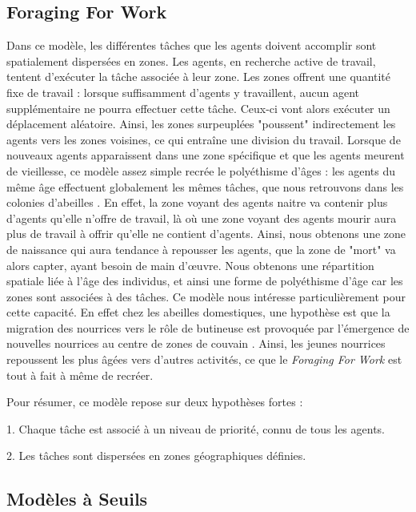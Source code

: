 		\subsection{Foraging For Work  \cite{franks_foraging_1994}}
        Dans ce modèle, les différentes tâches que les agents doivent accomplir sont spatialement dispersées en zones. Les agents, en recherche active de travail, tentent d'exécuter la tâche associée à leur zone. Les zones offrent une quantité fixe de travail : lorsque suffisamment d'agents y travaillent, aucun agent supplémentaire ne pourra effectuer cette tâche. Ceux-ci vont alors exécuter un déplacement aléatoire. Ainsi, les zones surpeuplées "poussent" indirectement les agents vers les zones voisines, ce qui entraîne une division du travail. Lorsque de nouveaux agents apparaissent dans une zone spécifique et que les agents meurent de vieillesse, ce modèle assez simple recrée le polyéthisme d'âges : les agents du même âge effectuent globalement les mêmes tâches, que nous retrouvons dans les colonies d'abeilles \cite{seeley_age_1991}. En effet, la zone voyant des agents naitre va contenir plus d'agents qu'elle n'offre de travail, là où une zone voyant des agents mourir aura plus de travail à offrir qu'elle ne contient d'agents. Ainsi, nous obtenons une zone de naissance qui aura tendance à repousser les agents, que la zone de "mort" va alors capter, ayant besoin de main d'œuvre. Nous obtenons une répartition spatiale liée à l'âge des individus, et ainsi une forme de polyéthisme d'âge car les zones sont associées à des tâches. Ce modèle nous intéresse particulièrement pour cette capacité. En effet chez les abeilles domestiques, une hypothèse est que la migration des nourrices vers le rôle de butineuse est provoquée par l'émergence de nouvelles nourrices au centre de zones de couvain  \cite{seeley_age_1991}. Ainsi, les jeunes nourrices repoussent les plus âgées vers d'autres activités, ce que le \textit{Foraging For Work} est tout à fait à même de recréer.
        
        Pour résumer, ce modèle repose sur deux hypothèses fortes :
        
        1. Chaque tâche est associé à un niveau de priorité, connu de tous les agents.
        
        2. Les tâches sont dispersées en zones géographiques définies.
        
        
		\subsection{Modèles à Seuils}
		\label{subsectionRTM}
